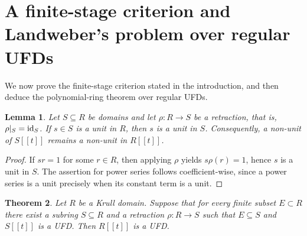 \documentclass{article}
\newcommand{\id}{{\rm id}}
\theoremstyle{plain}
\newtheorem{theorem}{Theorem}[section]
\newtheorem{lemma}[theorem]{Lemma}
\theoremstyle{definition}
\theoremstyle{remark}
\theoremstyle{plain}
\begin{document}
\section{A finite-stage criterion and Landweber's problem over regular UFDs}\label{sec:finite_means_prime_proof}

We now prove the finite-stage criterion stated in the introduction, and then deduce the polynomial-ring theorem over regular UFDs.

\begin{lemma}\label{retraction_units}
Let $S\subseteq R$ be domains and let $\rho:R\to S$ be a retraction, that is, $\rho|_S=\id_S$. If $s\in S$ is a unit in $R$, then $s$ is a unit in $S$. Consequently, a non-unit of $S[[t]]$ remains a non-unit in $R[[t]]$.
\end{lemma}

\begin{proof}
If $sr=1$ for some $r\in R$, then applying $\rho$ yields $s\rho(r)=1$, hence $s$ is a unit in $S$. The assertion for power series follows coefficient-wise, since a power series is a unit precisely when its constant term is a unit.
\end{proof}

\begin{theorem}\label{finite_stage_retract_criterion}
Let $R$ be a Krull domain. Suppose that for every finite subset $E\subset R$ there exist a subring $S\subseteq R$ and a retraction $\rho:R\to S$ such that $E\subseteq S$ and $S[[t]]$ is a UFD. Then $R[[t]]$ is a UFD.
\end{theorem}
\end{document}
